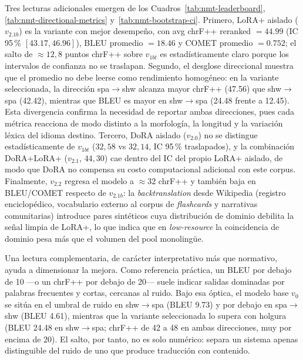 \documentclass[12pt,a4paper,oneside]{book}
\begin{document}
Tres lecturas adicionales emergen de los Cuadros~\ref{tab:nmt-leaderboard}, \ref{tab:nmt-directional-metrics} y~\ref{tab:nmt-bootstrap-ci}. Primero, LoRA+ aislado (\(v_{2.1b}\)) es la variante con mejor desempeño, con avg chrF++ reranked \(=44.99\) (IC 95\,\% \([43.17, 46.96]\)), BLEU promedio \(=18.46\) y COMET promedio \(=0.752\); el salto de \(\approx 12{,}8\) puntos chrF++ sobre \(v_{1bt}\) es estadísticamente claro porque los intervalos de confianza no se traslapan. Segundo, el desglose direccional muestra que el promedio no debe leerse como rendimiento homogéneo: en la variante seleccionada, la dirección spa\(\rightarrow\)shw alcanza mayor chrF++ (47.56) que shw\(\rightarrow\)spa (42.42), mientras que BLEU es mayor en shw\(\rightarrow\)spa (24.48 frente a 12.45). Esta divergencia confirma la necesidad de reportar ambas direcciones, pues cada métrica reacciona de modo distinto a la morfología, la longitud y la variación léxica del idioma destino. Tercero, DoRA aislado (\(v_{2.0}\)) no se distingue estadísticamente de \(v_{1bt}\) (\(32{,}58\) vs \(32{,}14\), IC 95\,\% traslapados), y la combinación DoRA+LoRA+ (\(v_{2.1}\), \(44{,}30\)) cae dentro del IC del propio LoRA+ aislado, de modo que DoRA no compensa su costo computacional adicional con este corpus. Finalmente, \(v_{2.2}\) regresa el modelo a \(\approx 32\) chrF++ y también baja en BLEU/COMET respecto de \(v_{2.1b}\): la \emph{backtranslation} desde Wikipedia (registro enciclopédico, vocabulario externo al corpus de \emph{flashcards} y narrativas comunitarias) introduce pares sintéticos cuya distribución de dominio debilita la señal limpia de LoRA+, lo que indica que en \emph{low-resource} la coincidencia de dominio pesa más que el volumen del pool monolingüe.

Una lectura complementaria, de carácter interpretativo más que normativo, ayuda a dimensionar la mejora. Como referencia práctica, un BLEU por debajo de 10 —o un chrF++ por debajo de 20— suele indicar salidas dominadas por palabras frecuentes y cortas, cercanas al ruido. Bajo esa óptica, el modelo base \(v_0\) se sitúa en el umbral de ruido en shw\(\rightarrow\)spa (BLEU 9.73) y por debajo en spa\(\rightarrow\)shw (BLEU 4.61), mientras que la variante seleccionada lo supera con holgura (BLEU 24.48 en shw\(\rightarrow\)spa; chrF++ de 42 a 48 en ambas direcciones, muy por encima de 20). El salto, por tanto, no es solo numérico: separa un sistema apenas distinguible del ruido de uno que produce traducción con contenido.
\end{document}
